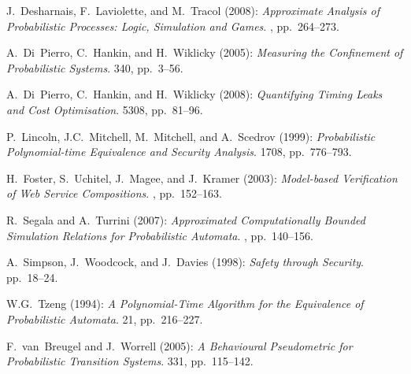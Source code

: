 \documentclass[copyright,creativecommons]{eptcs}
\begin{document}
\begin{thebibliography}{1}
J.~Desharnais, F.~Laviolette, and M.~Tracol (2008): 
\newblock \emph{Approximate Analysis of Probabilistic Processes: Logic, Simulation and Games}. 
, pp.~264--273.

 A.~Di~Pierro, C.~Hankin, and H.~Wiklicky (2005):
\newblock \emph{Measuring the Confinement of Probabilistic Systems}.
 340, pp.~3--56.

 A.~Di~Pierro, C.~Hankin, and H.~Wiklicky (2008):
\newblock \emph{Quantifying Timing Leaks and Cost Optimisation}.
 5308, pp.~81--96.

 P.~Lincoln, J.C.~Mitchell, M.~Mitchell, and A.~Scedrov (1999):
\newblock \emph{Probabilistic Polynomial-time Equivalence and Security Analysis}.
1708, pp.~776--793.

H.~Foster, S.~Uchitel, J.~Magee, and J.~Kramer (2003):
\newblock \emph{Model-based Verification of Web Service Compositions}.
, pp.~152--163.

R.~Segala and A.~Turrini (2007):
\newblock \emph{Approximated Computationally Bounded Simulation Relations for Probabilistic Automata}.
, pp.~140--156.

 A.~Simpson, J.~Woodcock, and J.~Davies (1998):
\newblock \emph{Safety through Security}.
 pp.~18--24.

W.G.~Tzeng (1994):
\newblock \emph{A Polynomial-Time Algorithm for the Equivalence of Probabilistic Automata}.
 21, pp.~216--227.

F.~van~Breugel and J.~Worrell (2005): 
\newblock \emph{A Behavioural Pseudometric for Probabilistic Transition Systems}. 
 331, pp.~115--142.


\end{thebibliography}
\end{document}
